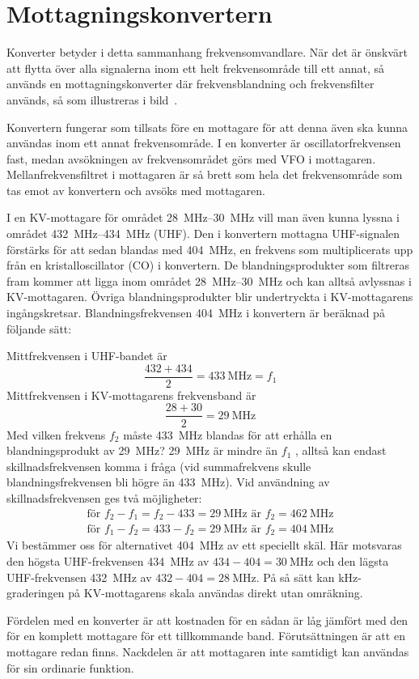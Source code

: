 \newpage
\section{Mottagningskonvertern}


Konverter betyder i detta sammanhang frekvensomvandlare.
När det är önskvärt att flytta över alla signalerna inom ett helt frekvensområde
till ett annat, så används en mottagningskonverter där frekvensblandning och
frekvensfilter används, så som illustreras i bild~.

Konvertern fungerar som tillsats före en mottagare för att denna även
ska kunna användas inom ett annat frekvensområde.
I en konverter är oscillatorfrekvensen fast, medan avsökningen av
frekvensområdet görs med VFO i mottagaren.
Mellanfrekvensfiltret i mottagaren är så brett som hela det frekvensområde
som tas emot av konvertern och avsöks med mottagaren.

\begin{exempelbox}
I en KV-mottagare för området \SIrange{28}{30}{\mega\hertz} vill man även kunna
lyssna i området \SIrange{432}{434}{\mega\hertz} (UHF).
Den i konvertern mottagna UHF-signalen förstärks för att sedan blandas med
\qty{404}{\mega\hertz}, en frekvens som multiplicerats upp från en
kristalloscillator (CO) i konvertern.
De blandningsprodukter som filtreras fram kommer att ligga inom området
\SIrange{28}{30}{\mega\hertz} och kan alltså avlyssnas i KV-mottagaren.
Övriga blandningsprodukter blir undertryckta i KV-mottagarens ingångskretsar.
Blandningsfrekvensen \qty{404}{\mega\hertz} i konvertern är beräknad på följande
sätt:

\noindent
Mittfrekvensen i UHF-bandet är
\[\frac{432+434}{2} = \qty{433}{\mega\hertz} = f_1\]
Mittfrekvensen i KV-mottagarens frekvensband är
\[\frac{28 + 30}{2} = \qty{29}{\mega\hertz}\]
Med vilken frekvens \(f_2\) måste \qty{433}{\mega\hertz} blandas för att erhålla
en blandningsprodukt av \qty{29}{\mega\hertz}?
\qty{29}{\mega\hertz} är mindre än \(f_1\) , alltså kan endast
skillnadsfrekvensen komma i fråga (vid summafrekvens skulle blandningsfrekvensen
bli högre än \qty{433}{\mega\hertz}).
Vid användning av skillnadsfrekvensen ges två möjligheter:
\begin{gather*}
  \text{för }f_2 - f_1 = f_2 - 433 = \qty{29}{\mega\hertz}\text{ är }f_2 = \qty{462}{\mega\hertz} \\
  \text{för }f_1 - f_2 = 433 - f_2 = \qty{29}{\mega\hertz}\text{ är }f_2 = \qty{404}{\mega\hertz}
\end{gather*}
Vi bestämmer oss för alternativet \qty{404}{\mega\hertz} av ett speciellt skäl.
Här motsvaras den högsta UHF-frekvensen \qty{434}{\mega\hertz} av \(434 - 404 =
\qty{30}{\mega\hertz}\) och den lägsta UHF-frekvensen \qty{432}{\mega\hertz} av
\(432 - 404 = \qty{28}{\mega\hertz}\).
På så sätt kan kHz-graderingen på KV-mottagarens skala användas direkt utan
omräkning.
\end{exempelbox}

Fördelen med en konverter är att kostnaden för en sådan är låg jämfört
med den för en komplett mottagare för ett tillkommande band.
Förutsättningen är att en mottagare redan finns.
Nackdelen är att mottagaren inte samtidigt kan användas för sin
ordinarie funktion.
